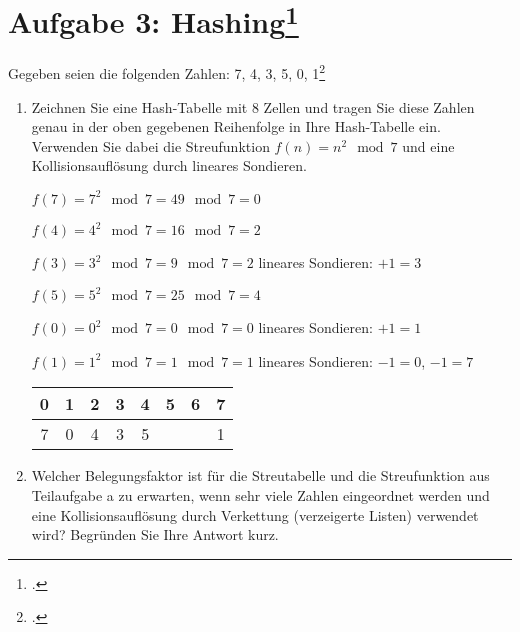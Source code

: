 \documentclass{lehramt-informatik}
\begin{document}
%

\section{Aufgabe 3: Hashing\footcite[Seite 2]{aud:pu:5}}

Gegeben seien die folgenden Zahlen: 7, 4, 3, 5, 0, 1\footcite[Frühjahr
2005, Thema 2, A 8]{examen:66112:2005:03}

\begin{enumerate}


\item Zeichnen Sie eine Hash-Tabelle mit 8 Zellen und tragen Sie diese
Zahlen genau in der oben gegebenen Reihenfolge in Ihre Hash-Tabelle ein.
Verwenden Sie dabei die Streufunktion $f(n) = n^2 \mod 7$ und eine
Kollisionsauflösung durch lineares Sondieren.

\begin{antwort}
{
\footnotesize
$f(7) = 7^2 \mod 7 = 49 \mod 7 = 0$

$f(4) = 4^2 \mod 7 = 16 \mod 7 = 2$

$f(3) = 3^2 \mod 7 = 9 \mod 7 = 2$ lineares Sondieren: $+1 = 3$

$f(5) = 5^2 \mod 7 = 25 \mod 7 = 4$

$f(0) = 0^2 \mod 7 = 0 \mod 7 = 0$ lineares Sondieren: $+1 = 1$

$f(1) = 1^2 \mod 7 = 1 \mod 7 = 1$ lineares Sondieren: $-1 = 0$, $-1 = 7$
}

\begin{tabular}{|c|c|c|c|c|c|c|c|}
\hline
0 & 1 & 2 & 3 & 4 & 5 & 6 & 7 \\\hline
7 & 0 & 4 & 3 & 5 &   &   & 1 \\\hline
\end{tabular}

\end{antwort}


\item Welcher Belegungsfaktor ist für die Streutabelle und die
Streufunktion aus Teilaufgabe a zu erwarten, wenn sehr viele Zahlen
eingeordnet werden und eine Kollisionsauflösung durch Verkettung
(verzeigerte Listen) verwendet wird? Begründen Sie Ihre Antwort kurz.

\end{enumerate}
\end{document}

